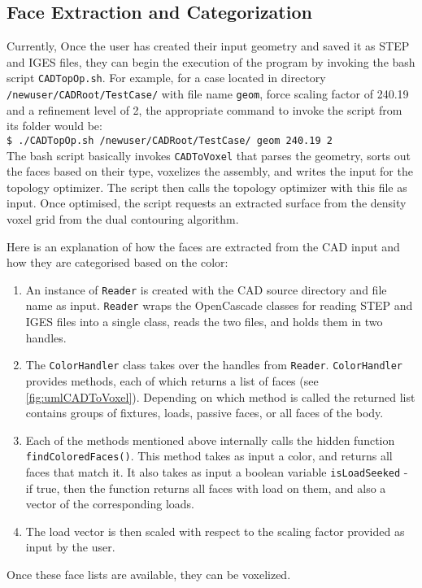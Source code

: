 \subsection{Face Extraction and Categorization}
\label{sec: FaceExtraction}


Currently, Once the user has created their input geometry and saved it as STEP and IGES files, they can begin the execution of the program by invoking the bash script \lstinline|CADTopOp.sh|. For example, for a case located in directory \lstinline|/newuser/CADRoot/TestCase/| with file name \lstinline|geom|, force scaling factor of 240.19 and a refinement level of 2, the appropriate command to invoke the script from its folder would be: \\

\lstinline|$ ./CADTopOp.sh /newuser/CADRoot/TestCase/ geom 240.19 2| \\

The bash script basically invokes \lstinline|CADToVoxel| that parses the geometry, sorts out the faces based on their type, voxelizes the assembly, and writes the input for the topology optimizer. The script then calls the topology optimizer with this file as input. Once optimised, the script requests an extracted surface from the density voxel grid from the dual contouring algorithm. 


Here is an explanation of how the faces are extracted from the CAD input and how they are categorised based on the color:

\begin{enumerate}
	\item An instance of \lstinline|Reader| is created with the CAD source directory and file name as input. \lstinline|Reader| wraps the OpenCascade classes for reading STEP and IGES files into a single class, reads the two files, and holds them in two handles.
	\item The \lstinline|ColorHandler| class takes over the handles from \lstinline|Reader|. \lstinline|ColorHandler| provides methods, each of which returns a list of faces (see \autoref{fig:umlCADToVoxel}). Depending on which method is called the returned list contains groups of fixtures, loads, passive faces, or all faces of the body.
	\item Each of the methods mentioned above internally calls the hidden function \lstinline|findColoredFaces()|. This method takes as input a color, and returns all faces that match it. It also takes as input a boolean variable \lstinline|isLoadSeeked| - if true, then the function returns all faces with load on them, and also a vector of the corresponding loads.
	\item The load vector is then scaled with respect to the scaling factor provided as input by the user.
\end{enumerate}

Once these face lists are available, they can be voxelized.
